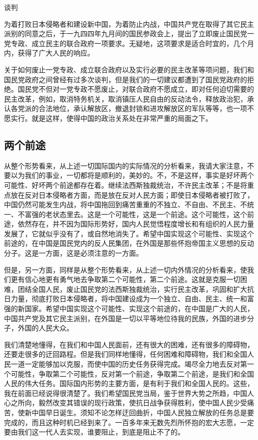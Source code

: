 谈判

为着打败日本侵略者和建设新中国，为着防止内战，中国共产党在取得了其它民主派别的同意之后，于一九四四年九月间的国民参政会上，提出了立即废止国民党一党专政、成立民主的联合政府一项要求。无疑地，这项要求是适合时宜的，几个月内，获得了广大人民的响应。

关于如何废止一党专政、成立联合政府以及实行必要的民主改革等项问题，我们和国民党政府之间曾经有过多次谈判，但是我们的一切建议都遭到了国民党政府的拒绝。国民党不但对一党专政不愿废止，对联合政府不愿成立，即对任何迫切需要的民主改革，例如，取消特务机关，取消镇压人民自由的反动法令，释放政治犯，承认各党派的合法地位，承认解放区，撤退封锁和进攻解放区的军队等等，也一项不愿实行。就是这样，使得中国的政治关系处在非常严重的局面之下。

\subsection{两个前途}

从整个形势看来，从上述一切国际国内的实际情况的分析看来，我请大家注意，不要以为我们的事业，一切都将是顺利的，美妙的。不，不是这样，事实是好坏两个可能性、好坏两个前途都存在着。继续法西斯独裁统治，不许民主改革；不是将重点放在反对日本侵略者方面，而是放在反对人民方面；即使日本侵略者被打败了，中国仍然可能发生内战，将中国拖回到痛苦重重的不独立、不自由、不民主、不统一、不富强的老状态里去。这是一个可能性，这是一个前途。这个可能性，这个前途，依然存在，并不因为国际形势好，国内人民觉悟程度增长和有组织的人民力量发展了，它就似乎没有了，或自然地消失了。希望中国实现这个可能性、实现这个前途的，在中国是国民党内的反人民集团，在外国是那些怀抱帝国主义思想的反动分子。这是一方面，这是必须注意的一方面。

但是，另一方面，同样是从整个形势看来，从上述一切内外情况的分析看来，使我们更有信心地更有勇气地去争取第二个可能性，第二个前途。这就是克服一切困难，团结全国人民，废止国民党的法西斯独裁统治，实行民主改革，巩固和扩大抗日力量，彻底打败日本侵略者，将中国建设成为一个独立、自由、民主、统一和富强的新国家。希望中国实现这个可能性、实现这个前途的，在中国是广大的人民，中国共产党及其它民主派别，在外国是一切以平等地位待我的民族，外国的进步分子，外国的人民大众。

我们清楚地懂得，在我们和中国人民面前，还有很大的困难，还有很多的障碍物，还要走很多的迂回路程。但是我们同样地懂得，任何困难和障碍物，我们和全国人民一道一定能够加以克服，而使中国的历史任务获得完成。竭尽全力地去反对第一个可能性，争取第二个可能性，反对第一个前途，争取第二个前途，是我们和全国人民的伟大任务。国际国内形势的主要方面，是有利于我们和全国人民的。这些，我在前面已经说得很清楚了。我们希望国民党当局，鉴于世界大势之所趋，中国人心之所向，毅然改变其错误的现行政策，使抗日战争获得胜利，使中国人民少受痛苦，使新中国早日诞生。须知不论怎样迂回曲折，中国人民独立解放的任务总是要完成的，而且这种时机已经到来了。一百多年来无数先烈所怀抱的宏大志愿，一定要由我们这一代人去实现，谁要阻止，到底是阻止不了的。

